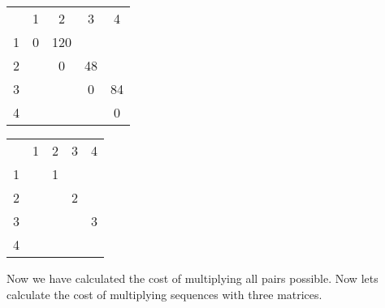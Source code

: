 \documentclass[12pt]{article}
\begin{document}
\begin{center}
\label*{$m$}
\begin{tabular}{ c|c|c|c|c| }
    \multicolumn{1}{c}{}
    & \multicolumn{1}{c}{1}
    & \multicolumn{1}{c}{2}
    & \multicolumn{1}{c}{3}
    & \multicolumn{1}{c}{4}\\

    \cline{2-5}
        1 & 0 & 120 &  &  \\
    \cline{2-5}
        2 &  & 0 & 48 &  \\
    \cline{2-5}
        3 &  &  & 0 & 84 \\
    \cline{2-5}
        4 &  &  &  & 0 \\
    \cline{2-5}
\end{tabular}
\end{center}

\begin{center}
\label*{$s$}
\begin{tabular}{ c|c|c|c|c| }
    \multicolumn{1}{c}{}
    & \multicolumn{1}{c}{1}
    & \multicolumn{1}{c}{2}
    & \multicolumn{1}{c}{3}
    & \multicolumn{1}{c}{4}\\

    \cline{2-5}
        1 &  & 1 &  &  \\
    \cline{2-5}
        2 &  &  & 2 &  \\
    \cline{2-5}
        3 &  &  &  & 3 \\
    \cline{2-5}
        4 &  &  &  &  \\
    \cline{2-5}
\end{tabular}
\end{center}

Now we have calculated the cost of multiplying all pairs possible. Now lets calculate the cost of multiplying sequences with three matrices.
\end{document}
